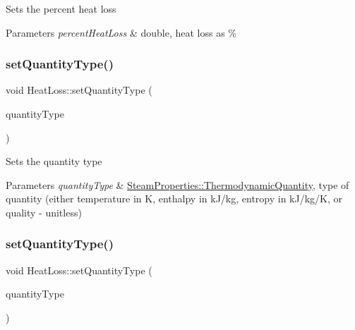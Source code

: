 Sets the percent heat loss 
\begin{DoxyParams}{Parameters}
{\em percent\+Heat\+Loss} & double, heat loss as \% \\
\hline
\end{DoxyParams}
\mbox{\label{class_heat_loss_a7c125f1137f31eba8826a1aa3b905290}} 
\subsubsection{\texorpdfstring{set\+Quantity\+Type()}{setQuantityType()}\hspace{0.1cm}{\footnotesize\ttfamily [1/3]}}
{\footnotesize\ttfamily void Heat\+Loss\+::set\+Quantity\+Type (\begin{DoxyParamCaption}\item[{\hyperlink{class_steam_properties_ae0294bedf7d178c2d8fb6aed0f62fbff}{Steam\+Properties\+::\+Thermodynamic\+Quantity}}]{quantity\+Type }\end{DoxyParamCaption})}

Sets the quantity type 
\begin{DoxyParams}{Parameters}
{\em quantity\+Type} & \hyperlink{class_steam_properties_ae0294bedf7d178c2d8fb6aed0f62fbff}{Steam\+Properties\+::\+Thermodynamic\+Quantity}, type of quantity (either temperature in K, enthalpy in k\+J/kg, entropy in k\+J/kg/K, or quality -\/ unitless) \\
\hline
\end{DoxyParams}
\mbox{\label{class_heat_loss_a7c125f1137f31eba8826a1aa3b905290}} 
\subsubsection{\texorpdfstring{set\+Quantity\+Type()}{setQuantityType()}\hspace{0.1cm}{\footnotesize\ttfamily [2/3]}}
{\footnotesize\ttfamily void Heat\+Loss\+::set\+Quantity\+Type (\begin{DoxyParamCaption}\item[{\hyperlink{class_steam_properties_ae0294bedf7d178c2d8fb6aed0f62fbff}{Steam\+Properties\+::\+Thermodynamic\+Quantity}}]{quantity\+Type }\end{DoxyParamCaption})}


